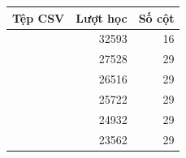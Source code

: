 \begin{tabularx}{\linewidth}{@{}Yrr@{}}
\toprule
\textbf{Tệp CSV} & \textbf{Lượt học} & \textbf{Số cột} \\
\midrule
{} & \num{32593} & \num{16} \\
 & \num{27528} & \num{29} \\
 & \num{26516} & \num{29} \\
 & \num{25722} & \num{29} \\
 & \num{24932} & \num{29} \\
 & \num{23562} & \num{29} \\
\bottomrule
\end{tabularx}

